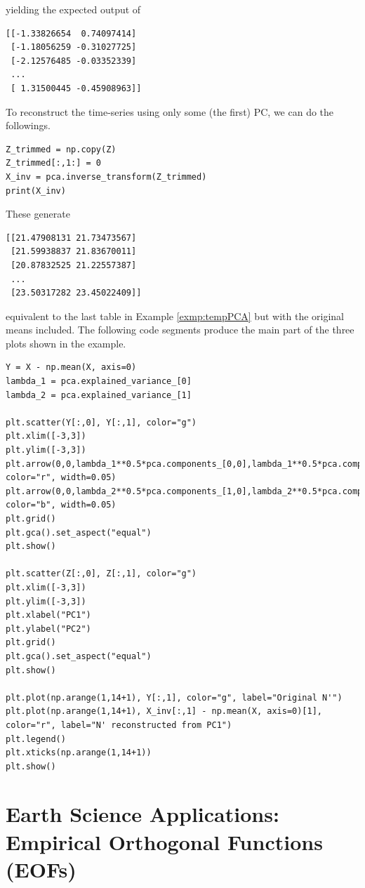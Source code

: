 yielding the expected output of
\begin{lstlisting}
[[-1.33826654  0.74097414]
 [-1.18056259 -0.31027725]
 [-2.12576485 -0.03352339]
 ...
 [ 1.31500445 -0.45908963]]    
\end{lstlisting}
To reconstruct the time-series using only some (the first) PC, we can do the followings.
\begin{lstlisting}
Z_trimmed = np.copy(Z)
Z_trimmed[:,1:] = 0
X_inv = pca.inverse_transform(Z_trimmed)
print(X_inv)
\end{lstlisting}
These generate
\begin{lstlisting}
[[21.47908131 21.73473567]
 [21.59938837 21.83670011]
 [20.87832525 21.22557387]
 ...
 [23.50317282 23.45022409]]    
\end{lstlisting}
equivalent to the last table in Example \ref{exmp:tempPCA} but with the original means included. The following code segments produce the main part of the three plots shown in the example.
\begin{lstlisting}
Y = X - np.mean(X, axis=0)
lambda_1 = pca.explained_variance_[0]
lambda_2 = pca.explained_variance_[1]

plt.scatter(Y[:,0], Y[:,1], color="g")
plt.xlim([-3,3])
plt.ylim([-3,3])
plt.arrow(0,0,lambda_1**0.5*pca.components_[0,0],lambda_1**0.5*pca.components_[0,1], color="r", width=0.05)
plt.arrow(0,0,lambda_2**0.5*pca.components_[1,0],lambda_2**0.5*pca.components_[1,1], color="b", width=0.05)
plt.grid()
plt.gca().set_aspect("equal")
plt.show()

plt.scatter(Z[:,0], Z[:,1], color="g")
plt.xlim([-3,3])
plt.ylim([-3,3])
plt.xlabel("PC1")
plt.ylabel("PC2")
plt.grid()
plt.gca().set_aspect("equal")
plt.show()

plt.plot(np.arange(1,14+1), Y[:,1], color="g", label="Original N'")
plt.plot(np.arange(1,14+1), X_inv[:,1] - np.mean(X, axis=0)[1], color="r", label="N' reconstructed from PC1")
plt.legend()
plt.xticks(np.arange(1,14+1))
plt.show()
\end{lstlisting}

\section{Earth Science Applications: Empirical Orthogonal Functions (EOFs)}
\label{section:EOF}

